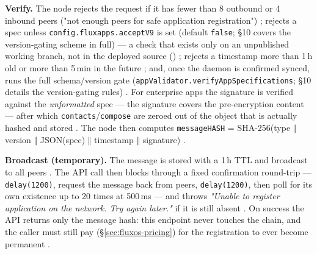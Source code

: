 \textbf{Verify.} The node rejects the request if it has fewer than 8 outbound or 4 inbound peers
("not enough peers for safe application registration")
; rejects a
 spec unless \texttt{config.\allowbreak{}fluxapps.\allowbreak{}acceptV9} is set (default \texttt{false}; \S10
covers the version-gating scheme in full) --- a check that exists only on an unpublished working
branch, not in the deployed source (\inprogress)
;
rejects a timestamp more than 1\,h old or more than 5\,min in the future
; and, once the
daemon is confirmed synced, runs the full schema/version gate
(\texttt{appValidator.\allowbreak{}verifyAppSpecifications}; \S10 details the version-gating rules)
. For enterprise
apps the signature is verified against the \emph{unformatted} spec — the signature covers the
pre-encryption content — after which \texttt{contacts}\slash\texttt{compose} are zeroed out of the
object that is actually hashed and stored
. The node then
computes \texttt{messageHASH} = SHA-256(type $\Vert$ version $\Vert$ JSON(spec) $\Vert$ timestamp
$\Vert$ signature) .

\textbf{Broadcast (temporary).} The message is stored with a 1\,h TTL and broadcast to all peers
. The API call then
blocks through a fixed confirmation round-trip — \texttt{delay(1200)}, request the message back
from peers, \texttt{delay(1200)}, then poll for its own existence up to 20 times at 500\,ms — and
throws \emph{"Unable to register application on the network. Try again later."} if it is still
absent . On success
the API returns only the message hash: this endpoint never touches the chain, and the caller must
still pay (\S\ref{sec:fluxos-pricing}) for the registration to ever become permanent
.

